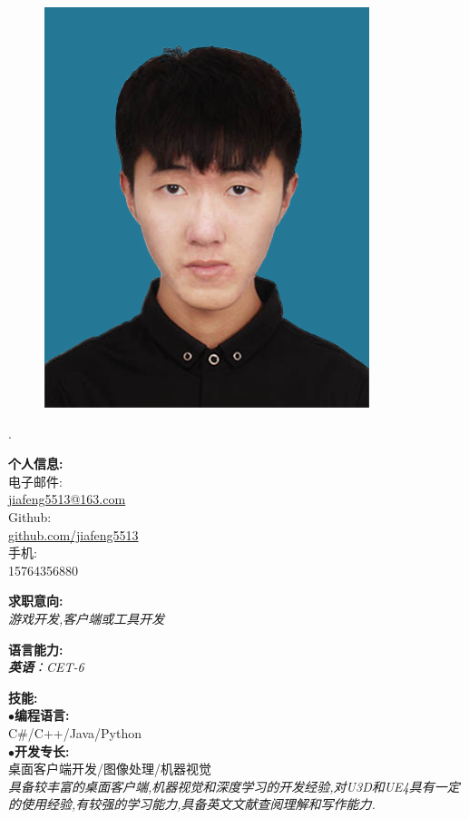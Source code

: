 \documentclass[a4paper,12pt,final]{memoir}
\newcommand{\myThemeColor}{RoyalBlue}
\newcommand{\SmallSep}{\vspace{0.9em}}
\newcommand{\CVItem}[1]
	{\textbf{\color{\myThemeColor} #1}}
\begin{document}
\begin{CJK*}{UTF8}{gbsn}%
\begin{figure}
	\hfill
	\includegraphics[width=0.8\columnwidth]{photo}
	\vspace{-7cm}
\end{figure}
\begin{flushright}\footnotesize
.\\
\vskip 6cm
    \raggedright
	\CVItem{{\large 个人信息:}}\\
	电子邮件:\\
	\href{mailto:jiafeng5513@163.com}{jiafeng5513@163.com}  \\
	Github:\\
	\href{github.com/jiafeng5513}{github.com/jiafeng5513} \\
	手机:\\
	15764356880
	\SmallSep
	\SmallSep

	\CVItem{{\large 求职意向:}}\\
	\textit{游戏开发,客户端或工具开发\\ }
	\SmallSep

	\CVItem{{\large 语言能力:}}\\
	\textit{\textbf{英语}：CET-6\\ }
	\SmallSep

	\CVItem{{\large 技能:}}\\
	$\bullet$\textbf{编程语言:}\\ C\#/C++/Java/Python\\
	$\bullet$\textbf{开发专长:}\\ 桌面客户端开发/图像处理/机器视觉 \\
	\SmallSep
	\textit{具备较丰富的桌面客户端,机器视觉和深度学习的开发经验,对U3D和UE4具有一定的使用经验,有较强的学习能力,具备英文文献查阅理解和写作能力.}
	

\end{flushright}
\end{CJK*}
\end{document}
